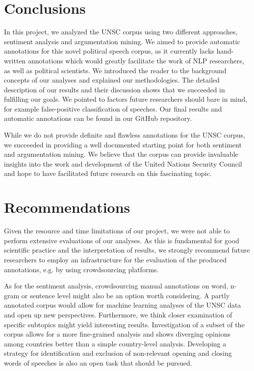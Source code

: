 \section{Conclusions}
\label{conclu}

In this project, we analyzed the UNSC corpus using two different approaches, sentiment analysis and argumentation mining. We aimed to provide automatic annotations for this novel political speech corpus, as it currently lacks hand-written annotations which would greatly facilitate the work of NLP researchers, as well as political scientists. We introduced the reader to the background concepts of our analyses and explained our methodologies. The detailed description of our results and their discussion shows that we succeeded in fulfilling our goals. We pointed to factors future researchers should bare in mind, for example false-positive classification of speeches. Our final results and automatic annotations can be found in our GitHub repository\footnotemark[2].

While we do not provide definite and flawless annotations for the UNSC corpus, we succeeded in providing a well documented starting point for both sentiment and argumentation mining. We believe that the corpus can provide invaluable insights into the work and development of the United Nations Security Council and hope to have facilitated future research on this fascinating topic.


\section{Recommendations}
\label{reco}

 Given the resource and time limitations of our project, we were not able to perform extensive evaluations of our analyses. As this is fundamental for good scientific practice and the interpretation of results, we strongly recommend future researchers to employ an infrastructure for the evaluation of the produced annotations, e.g. by using crowdsourcing platforms. 
 
 As for the sentiment analysis, crowdsourcing manual annotations on word, n-gram or sentence level might also be an option worth considering. A partly annotated corpus would allow for machine learning analyses of the UNSC data and open up new perspectives. Furthermore, we think closer examination of specific subtopics might yield interesting results. Investigation of a subset of the corpus allows for a more fine-grained analysis and shows diverging opinions among countries better than a simple country-level analysis. Developing a strategy for identification and exclusion of non-relevant opening and closing words of speeches is also an open task that should be pursued.
 
